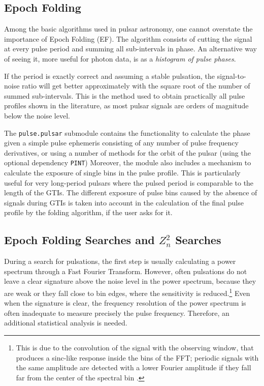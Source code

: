 \documentclass[twocolumn]{aastex62}
\newcommand{\zsq}{\ensuremath{Z^2_n}\xspace}
\begin{document}
\subsection{Epoch Folding}
Among the basic algorithms used in pulsar astronomy, one cannot overstate the importance of Epoch Folding (EF).
The algorithm consists of cutting the signal at every pulse period and summing all sub-intervals in phase. 
An alternative way of seeing it, more useful for photon data, is as a \textit {histogram of pulse phases}.

If the period is exactly correct and assuming a stable pulsation, the signal-to-noise ratio will get better approximately with the square root of the number of summed sub-intervals.
This is the method used to obtain practically all pulse profiles shown in the literature, as most pulsar signals are orders of magnitude below the noise level.

The \texttt{pulse.pulsar} submodule contains the functionality to calculate the phase given a simple pulse ephemeris consisting of any number of pulse frequency derivatives, or using a number of methods for the orbit of the pulsar (using the optional dependency \texttt{PINT})%
Moreover, the module also includes a mechanism to calculate the exposure of single bins in the pulse profile. 
This is particularly useful for very long-period pulsars where the pulsed period is comparable to the length of the GTIs.
The different exposure of pulse bins caused by the absence of signals during GTIs is taken into account in the calculation of the final pulse profile by the folding algorithm, if the user asks for it. 

\subsection{Epoch Folding Searches and \zsq Searches}
\label{sec:efzsq}
During a search for pulsations, the first step is usually calculating a power spectrum through a Fast Fourier Transform. 
However, often pulsations do not leave a clear signature above the noise level in the power spectrum, because they are weak or they fall close to bin edges, where the sensitivity is reduced.\footnote{This is due to the convolution of the signal with the observing window, that produces a sinc-like response inside the bins of the FFT; periodic signals with the same amplitude are detected with a lower Fourier amplitude if they fall far from the center of the spectral bin \citep{vanderklis1989}.}
Even when the signature is clear, the frequency resolution of the power spectrum is often inadequate to measure precisely the pulse frequency.
Therefore, an additional statistical analysis is needed. 
\end{document}
